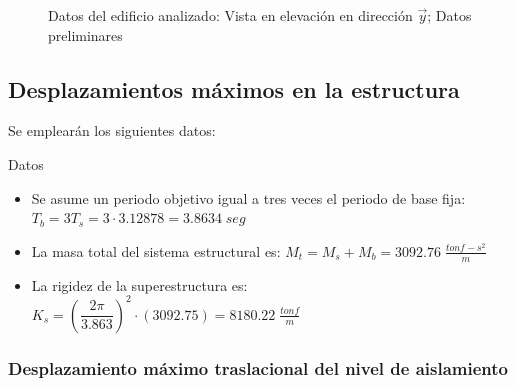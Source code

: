 \begin{figure}[h!]
\begin{subfigure}[b]{0.32\linewidth}
        \caption{}
        \label{i1_1.2}
    \end{subfigure}
    \caption[Datos del edificio analizado]{Datos del edificio analizado:
     Vista en elevación en dirección $\vec{y}$;
     Datos preliminares
    }
    \label{i1_1}
\end{figure}

\subsection{Desplazamientos máximos en la estructura}
Se emplearán los siguientes datos:
\begin{DATOS}{Datos}
    \begin{itemize}
        \item Se asume un periodo objetivo igual a tres veces el periodo de base fija: $T_b = 3T_s = 3 \cdot 3.12878 = 3.8634 \; seg$
        \item La masa total del sistema estructural es: $M_t = M_s + M_b = 3092.76 \; \frac{tonf-s^2}{m}$
        \item La rigidez de la superestructura es: $K_s = \left( \dfrac{2\pi}{3.863} \right)^2 \cdot (3092.75) = 8180.22 \; \frac{tonf}{m}$
    \end{itemize}
\end{DATOS}

\subsubsection{Desplazamiento máximo traslacional del nivel de aislamiento}

